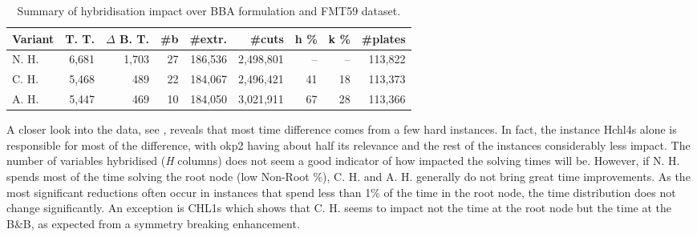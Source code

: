 \documentclass[ppgc,tese,english,formais,babel]{iiufrgs}
\begin{document}
\begin{table}
\caption{Summary of hybridisation impact over BBA formulation and FMT59 dataset.}
\label{tab:g2kp_hyb_summary}
\begin{center}

\begin{tabular}{lrrrrrrrr}
\hline\hline
\textbf{Variant} & \textbf{T. T.} & \textbf{\(\Delta\) B. T.} & \textbf{\#b} & \textbf{\#extr.} & \textbf{\#cuts} & \textbf{h \%} & \textbf{k \%} & \textbf{\#plates} \\\hline
N. H. & 6,681 & 1,703 & 27 & 186,536 & 2,498,801 & -- & -- & 113,822 \\
C. H. & 5,468 & 489 & 22 & 184,067 & 2,496,421 & 41 & 18 & 113,373 \\
A. H. & 5,447 & 469 & 10 & 184,050 & 3,021,911 & 67 & 28 & 113,366 \\\hline\hline
\end{tabular}
\end{center}

\end{table}

A closer look into the data, see , reveals that most time difference comes from a few hard instances.
In fact, the instance Hchl4s alone is responsible for most of the difference, with okp2 having about half its relevance and the rest of the instances considerably less impact.
The number of variables hybridised (\emph{H} columns) does not seem a good indicator of how impacted the solving times will be.
However, if N. H. spends most of the time solving the root node (low Non-Root \%), C. H. and A. H. generally do not bring great time improvements.
As the most significant reductions often occur in instances that spend less than 1\% of the time in the root node, the time distribution does not change significantly.
An exception is CHL1s which shows that C. H. seems to impact not the time at the root node but the time at the B\&B, as expected from a symmetry breaking enhancement.
\end{document}
